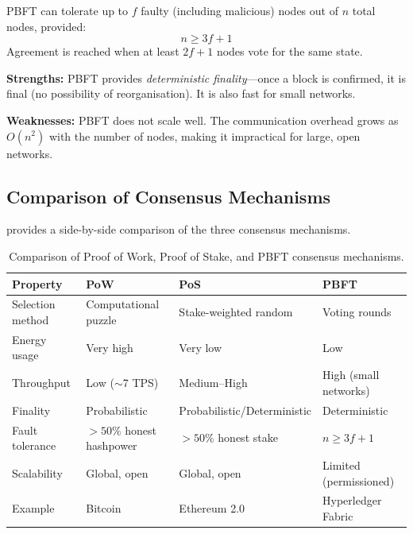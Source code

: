 PBFT can tolerate up to $f$ faulty (including malicious) nodes out of $n$ total nodes, provided:
\begin{equation}
    n \geq 3f + 1
    \label{eq:pbft-threshold}
\end{equation}
Agreement is reached when at least $2f + 1$ nodes vote for the same state.

\textbf{Strengths:} PBFT provides \emph{deterministic finality}---once a block is confirmed, it is final (no possibility of reorganisation). It is also fast for small networks.

\textbf{Weaknesses:} PBFT does not scale well. The communication overhead grows as $O(n^2)$ with the number of nodes, making it impractical for large, open networks.

\subsection{Comparison of Consensus Mechanisms}

 provides a side-by-side comparison of the three consensus mechanisms.

\begin{table}[htbp]
\centering
\renewcommand{\arraystretch}{1.3}
\begin{tabularx}{\textwidth}{l X X X}
\toprule
\textbf{Property} & \textbf{PoW} & \textbf{PoS} & \textbf{PBFT} \\
\midrule
Selection method    & Computational puzzle      & Stake-weighted random      & Voting rounds \\
Energy usage        & Very high                 & Very low                   & Low \\
Throughput          & Low ($\sim$7 TPS)         & Medium--High               & High (small networks) \\
Finality            & Probabilistic             & Probabilistic/Deterministic & Deterministic \\
Fault tolerance     & $> 50\%$ honest hashpower & $> 50\%$ honest stake      & $n \geq 3f+1$ \\
Scalability         & Global, open              & Global, open               & Limited (permissioned) \\
Example             & Bitcoin                   & Ethereum 2.0               & Hyperledger Fabric \\
\bottomrule
\end{tabularx}
\caption{Comparison of Proof of Work, Proof of Stake, and PBFT consensus mechanisms.}
\label{tab:consensus-comparison}
\end{table}

